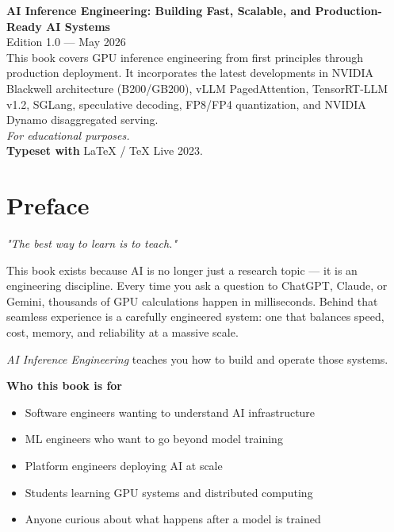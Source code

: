 \documentclass[11pt, twoside, openright]{book}
\begin{document}
\clearpage

\thispagestyle{empty}
\vspace*{\fill}
{\small
\noindent\textbf{AI Inference Engineering: Building Fast, Scalable, and Production-Ready AI Systems}\\[0.5em]
\noindent Edition 1.0 --- May 2026\\[0.5em]
\noindent This book covers GPU inference engineering from first principles through
production deployment.  It incorporates the latest developments in NVIDIA Blackwell
architecture (B200/GB200), vLLM PagedAttention, TensorRT-LLM v1.2, SGLang, speculative
decoding, FP8/FP4 quantization, and NVIDIA Dynamo disaggregated serving.\\[0.5em]
\noindent \textit{For educational purposes.}\\[1em]
\noindent \textbf{Typeset with} \LaTeX{} / TeX Live 2023.
}
\vspace*{\fill}
\clearpage

\tableofcontents
\clearpage

\chapter*{Preface}

\noindent\textit{"The best way to learn is to teach."}

\vspace{0.5em}

This book exists because AI is no longer just a research topic --- it is an
engineering discipline.  Every time you ask a question to ChatGPT, Claude, or
Gemini, thousands of GPU calculations happen in milliseconds.  Behind that seamless
experience is a carefully engineered system: one that balances speed, cost, memory,
and reliability at a massive scale.

\emph{AI Inference Engineering} teaches you how to build and operate those systems.

\bigskip
\noindent\textbf{Who this book is for}

\begin{itemize}
  \item Software engineers wanting to understand AI infrastructure
  \item ML engineers who want to go beyond model training
  \item Platform engineers deploying AI at scale
  \item Students learning GPU systems and distributed computing
  \item Anyone curious about what happens after a model is trained
\end{itemize}
\end{document}
